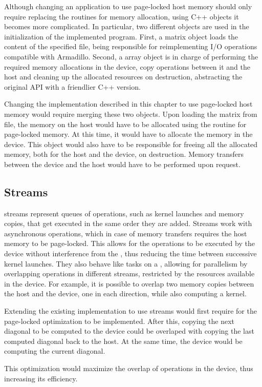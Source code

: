 \documentclass[../thesis]{subfiles}
\begin{document}
	Although changing an application to use page-locked host memory should only require replacing the routines for memory allocation, using C++ objects it becomes more complicated. In particular, two different objects are used in the initialization of the implemented program. First, a matrix object loads the content of the specified file, being responsible for reimplementing I/O operations compatible with Armadillo. Second, a \cuda array object is in charge of performing the required memory allocations in the device, copy operations between it and the host and cleaning up the allocated resources on destruction, abstracting the original \cuda API with a friendlier C++ version.

	Changing the \cuda implementation described in this chapter to use page-locked host memory would require merging these two objects. Upon loading the matrix from file, the memory on the host would have to be allocated using the routine for page-locked memory. At this time, it would have to allocate the memory in the device. This object would also have to be responsible for freeing all the allocated memory, both for the host and the device, on destruction. Memory transfers between the device and the host would have to be performed upon request.

	\subsection{Streams}
	\label{subsec:cuda:further:streams}

	\cuda streams represent queues of \gpu operations, such as kernel launches and memory copies, that get executed in the same order they are added. Streams work with asynchronous operations, which in case of memory transfers requires the host memory to be page-locked. This allows for the operations to be executed by the device without interference from the \cpu, thus reducing the time between successive kernel launches. They also behave like tasks on a \cpu, allowing for parallelism by overlapping operations in different streams, restricted by the resources available in the device. For example, it is possible to overlap two memory copies between the host and the device, one in each direction, while also computing a kernel.

	Extending the existing implementation to use streams would first require for the page-locked optimization to be implemented. After this, copying the next diagonal to be computed to the device could be overlaped with copying the last computed diagonal back to the host. At the same time, the device would be computing the current diagonal.

	This optimization would maximize the overlap of operations in the device, thus increasing its efficiency.
\end{document}
